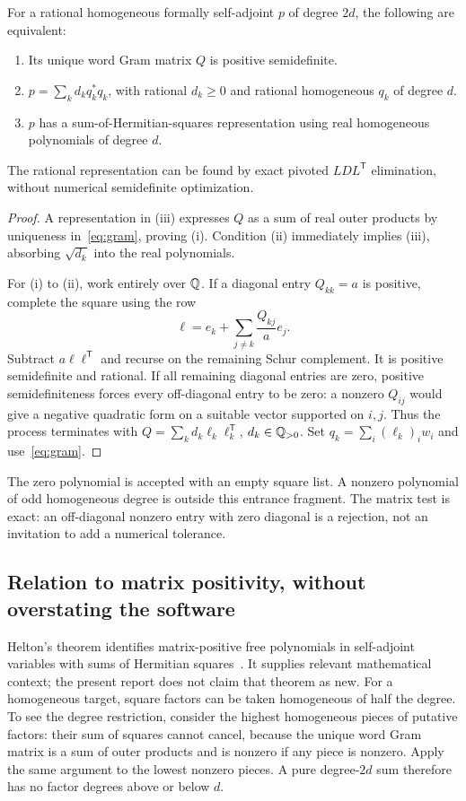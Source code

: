 \begin{theorem}\label{thm:gram}
For a rational homogeneous formally self-adjoint $p$ of degree $2d$, the
following are equivalent:
\begin{enumerate}[label=(\roman*),nosep]
\item Its unique word Gram matrix $Q$ is positive semidefinite.
\item $p=\sum_k d_k q_k^*q_k$, with rational $d_k\ge0$ and rational
homogeneous $q_k$ of degree $d$.
\item $p$ has a sum-of-Hermitian-squares representation using real homogeneous
polynomials of degree $d$.
\end{enumerate}
The rational representation can be found by exact pivoted $LDL^{\mathsf T}$
elimination, without numerical semidefinite optimization.
\end{theorem}
\begin{proof}
A representation in (iii) expresses $Q$ as a sum of real outer products by
uniqueness in~\eqref{eq:gram}, proving (i). Condition (ii) immediately implies
(iii), absorbing $\sqrt{d_k}$ into the real polynomials.

For (i) to (ii), work entirely over $\mathbb Q$. If a diagonal entry $Q_{kk}=a$ is
positive, complete the square using the row
\[
 \ell=e_k+\sum_{j\ne k}\frac{Q_{kj}}{a}e_j.
\]
Subtract $a\ell\ell^{\mathsf T}$ and recurse on the remaining Schur complement.
It is positive semidefinite and rational. If all remaining diagonal entries are
zero, positive semidefiniteness forces every off-diagonal entry to be zero: a
nonzero $Q_{ij}$ would give a negative quadratic form on a suitable vector
supported on $i,j$. Thus the process terminates with
$Q=\sum_k d_k\ell_k\ell_k^{\mathsf T}$, $d_k\in\mathbb Q_{>0}$. Set
$q_k=\sum_i(\ell_k)_i w_i$ and use~\eqref{eq:gram}.
\end{proof}

The zero polynomial is accepted with an empty square list. A nonzero polynomial
of odd homogeneous degree is outside this entrance fragment. The matrix test is
exact: an off-diagonal nonzero entry with zero diagonal is a rejection, not an
invitation to add a numerical tolerance.

\subsection{Relation to matrix positivity, without overstating the software}

Helton's theorem identifies matrix-positive free polynomials in self-adjoint
variables with sums of Hermitian squares~\cite{helton}. It supplies relevant
mathematical context; the present report does not claim that theorem as new.
For a homogeneous target, square factors can be taken homogeneous of half the
degree. To see the degree restriction, consider the highest homogeneous pieces
of putative factors: their sum of squares cannot cancel, because the unique
word Gram matrix is a sum of outer products and is nonzero if any piece is
nonzero. Apply the same argument to the lowest nonzero pieces. A pure
 degree-$2d$ sum therefore has no factor degrees above or below $d$.

